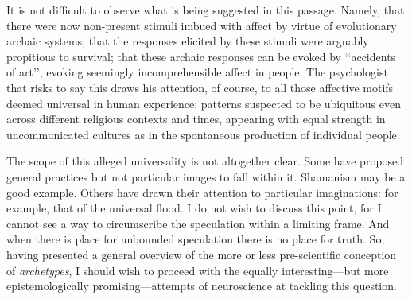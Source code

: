 \documentclass[a4paper]{article}
\begin{document}
    It is not difficult to observe what is being suggested in this passage.
    Namely, that there were now non-present stimuli imbued with affect by
    virtue of evolutionary archaic systems; that the responses elicited by
    these stimuli were arguably propitious to survival; that these archaic
    responses can be evoked by \lq\lq accidents of art\rq\rq, evoking seemingly
    incomprehensible affect in people. The psychologist that risks to say this
    draws his attention, of course, to all those affective motifs deemed
    universal in human experience: patterns suspected to be ubiquitous even
    across different religious contexts and times, appearing with equal
    strength in uncommunicated cultures as in the spontaneous production of
    individual people. 

    The scope of this alleged universality is not altogether clear. Some have
    proposed general practices but not particular images to fall within it.
    Shamanism may be a good example. Others have drawn their attention to
    particular imaginations: for example, that of the universal flood. I do not
    wish to discuss this point, for I cannot see a way to circumscribe the
    speculation within a limiting frame. And when there is place for unbounded
    speculation there is no place for truth. So, having presented a general
    overview of the more or less pre-scientific conception of
    \textit{archetypes}, I should wish to proceed with the equally
    interesting---but more epistemologically promising---attempts of
    neuroscience at tackling this question.
\end{document}
